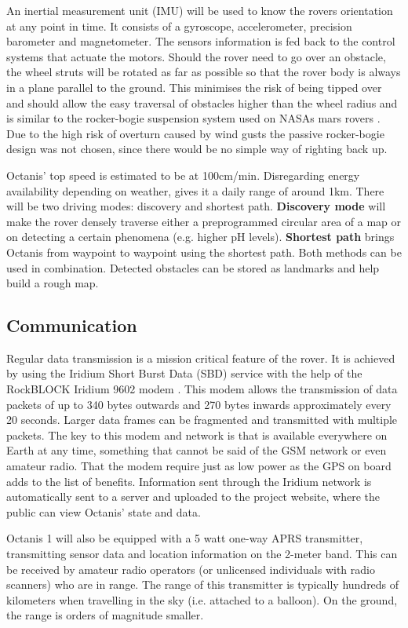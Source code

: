 \documentclass[a4paper,12pt]{article}
\begin{document}
An inertial measurement unit (IMU) will be used to know the rovers orientation at any point in time. It consists of a gyroscope, accelerometer, precision barometer and magnetometer. The sensors information is fed back to the control systems that actuate the motors. Should the rover need to go over an obstacle, the wheel struts will be rotated as far as possible so that the rover body is always in a plane parallel to the ground. This minimises the risk of being tipped over and should allow the easy traversal of obstacles higher than the wheel radius and is similar to the rocker-bogie suspension system used on NASAs mars rovers \cite{rockerbogie}. Due to the high risk of overturn caused by wind gusts the passive rocker-bogie design was not chosen, since there would be no simple way of righting back up.

Octanis' top speed is estimated to be at 100cm/min. Disregarding energy availability depending on weather, gives it a daily range of around 1km. There will be two driving modes: discovery and shortest path. \textbf{Discovery mode} will make the rover densely traverse either a preprogrammed circular area of a map or on detecting a certain phenomena (e.g. higher pH levels). \textbf{Shortest path} brings Octanis from waypoint to waypoint using the shortest path. Both methods can be used in combination. Detected obstacles can be stored as landmarks and help build a rough map.

\subsection{Communication}
Regular data transmission is a mission critical feature of the rover. It is achieved by using the Iridium Short Burst Data (SBD) service with the help of the RockBLOCK Iridium 9602 modem \cite{iridium}. This modem allows the transmission of data packets of up to 340 bytes outwards and 270 bytes inwards approximately every 20 seconds. Larger data frames can be fragmented and transmitted with multiple packets. The key to this modem and network is that is available everywhere on Earth at any time, something that cannot be said of the GSM network or even amateur radio. That the modem require just as low power as the GPS on board adds to the list of benefits. Information sent through the Iridium network is automatically sent to a server and uploaded to the project website, where the public can view Octanis' state and data.

Octanis 1 will also be equipped with a 5 watt one-way APRS transmitter, transmitting sensor data and location information on the 2-meter band. This can be received by amateur radio operators (or unlicensed individuals with radio scanners) who are in range. The range of this transmitter is typically hundreds of kilometers when travelling in the sky (i.e. attached to a balloon). On the ground, the range is orders of magnitude smaller.
\end{document}

